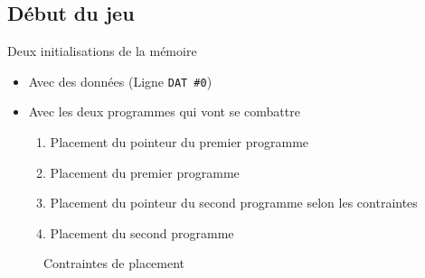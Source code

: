 \documentclass{beamer}
\begin{document}
\subsection{Début du jeu}
\begin{frame}%
\begin{center}
Deux initialisations de la mémoire
\end{center}
\begin{itemize}
    \item Avec des données (Ligne \texttt{DAT \#0})
    \item Avec les deux programmes qui vont se combattre
    \begin{enumerate}
        \item Placement du pointeur du premier programme
        \item Placement du premier programme
        \item Placement du pointeur du second programme selon les contraintes
        \item Placement du second programme
    \end{enumerate}
\end{itemize}
\begin{figure}
    \centering
    \caption{Contraintes de placement}
    \label{fig:my_label}
\end{figure}
\end{frame}
\end{document}
